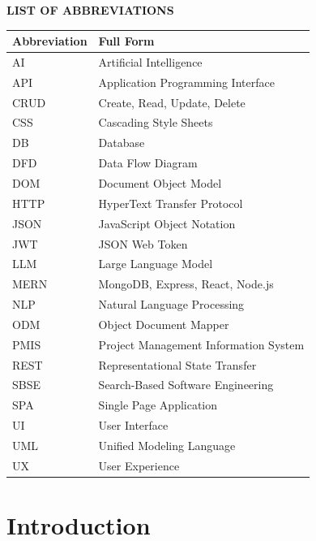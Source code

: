 \documentclass[12pt,a4paper,oneside]{report}
\begin{document}
\newpage
\begin{center}
{\large\textbf{LIST OF ABBREVIATIONS}}
\end{center}
\vspace{1cm}
\begin{longtable}{p{3cm}p{10cm}}
\toprule
\textbf{Abbreviation} & \textbf{Full Form} \\
\midrule
AI     & Artificial Intelligence \\
API    & Application Programming Interface \\
CRUD   & Create, Read, Update, Delete \\
CSS    & Cascading Style Sheets \\
DB     & Database \\
DFD    & Data Flow Diagram \\
DOM    & Document Object Model \\
HTTP   & HyperText Transfer Protocol \\
JSON   & JavaScript Object Notation \\
JWT    & JSON Web Token \\
LLM    & Large Language Model \\
MERN   & MongoDB, Express, React, Node.js \\
NLP    & Natural Language Processing \\
ODM    & Object Document Mapper \\
PMIS   & Project Management Information System \\
REST   & Representational State Transfer \\
SBSE   & Search-Based Software Engineering \\
SPA    & Single Page Application \\
UI     & User Interface \\
UML    & Unified Modeling Language \\
UX     & User Experience \\
\bottomrule
\end{longtable}
\thispagestyle{plain}

\newpage
{}

\chapter{Introduction}
\end{document}
